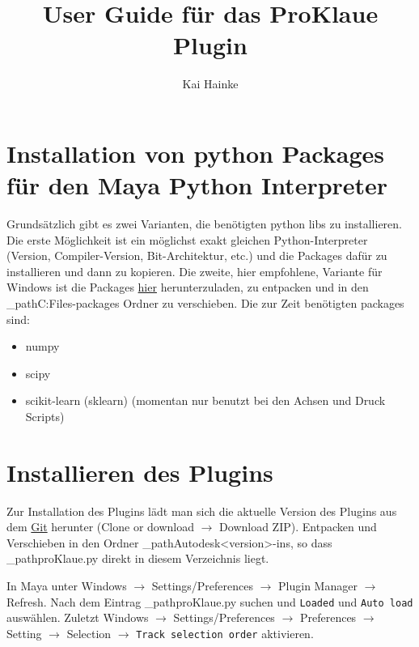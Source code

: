 \documentclass[a4paper, openany, oneside]{memoir}
\title{User Guide für das ProKlaue Plugin}
\author{Kai Hainke}
\begin{document}
\maketitle



\chapter{Installation von python Packages für den Maya Python Interpreter}
Grundsätzlich gibt es zwei Varianten, die benötigten python libs zu installieren. Die erste Möglichkeit ist ein möglichst exakt gleichen Python-Interpreter (Version, Compiler-Version, Bit-Architektur, etc.) und die Packages dafür zu installieren und dann zu kopieren. Die zweite, hier empfohlene, Variante für Windows ist die Packages \href{https://drive.google.com/drive/folders/0BwsYd1k8t0lEfjJqV21yTnd2elVhNXEyTXhHclhxbDhvWVF5WWZUeVFISWViaFh1TzhrNTQ}{hier} herunterzuladen, zu entpacken und in den \dir_path{C:\Program Files\Autodesk{}\Python\lib\site-packages} Ordner zu verschieben. Die zur Zeit benötigten packages sind:
\begin{itemize}
\item numpy
\item scipy
\item scikit-learn (sklearn) (momentan nur benutzt bei den Achsen und Druck Scripts)
\end{itemize}
 
  

\chapter{Installieren des Plugins}
Zur Installation des Plugins lädt man sich die aktuelle Version des Plugins aus dem \href{https://github.com/EnReich/ProKlaue}{Git} herunter (Clone or download \(\rightarrow\) Download ZIP). Entpacken und Verschieben in den Ordner \dir_path{Autodesk\maya<version>\bin\plug-ins}, so dass \File_path{proKlaue.py} direkt in diesem Verzeichnis liegt. 

In Maya unter Windows \(\rightarrow\) Settings/Preferences \(\rightarrow\) Plugin Manager \(\rightarrow\) Refresh. Nach dem Eintrag \File_path{proKlaue.py} suchen und \texttt{Loaded} und \texttt{Auto load} auswählen. Zuletzt Windows \(\rightarrow\) Settings/Preferences \(\rightarrow\) Preferences \(\rightarrow\) Setting \(\rightarrow\) Selection \(\rightarrow\) \texttt{Track selection order} aktivieren. 
\end{document}
